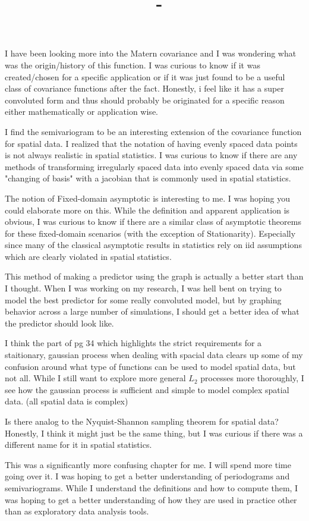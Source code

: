 \documentclass[answers,12pt,addpoints]{exam}
\author{\name}
\title{\course \ - \assignment}
\begin{document}
\maketitle

\begin{questions}
    \question I have been looking more into the Matern covariance and I was wondering what was the origin/history of this function. I was curious to know if it was created/chosen for a specific application or if it was just found to be a useful class of covariance functions after the fact. Honestly, i feel like it has a super convoluted form and thus should probably be originated for a specific reason either mathematically or application wise.

    \question I find the semivariogram to be an interesting extension of the covariance function for spatial data. I realized that the notation of having evenly spaced data points is not always realistic in spatial statistics. I was curious to know if there are any methods of transforming irregularly spaced data into evenly spaced data via some "changing of basis" with a jacobian that is commonly used in spatial statistics.

    \question The notion of Fixed-domain asymptotic is interesting to me. I was hoping you could elaborate more on this. While the definition and apparent application is obvious, I was curious to know if there are a similar class of asymptotic theorems for these fixed-domain scenarios (with the exception of Stationarity). Especially since many of the classical asymptotic results in statistics rely on iid assumptions which are clearly violated in spatial statistics. 

    \question This method of making a predictor using the graph is actually a better start than I thought. When I was working on my research, I was hell bent on trying to model the best predictor for some really convoluted model, but by graphing behavior across a large number of simulations, I should get a better idea of what the predictor should look like.

    \question I think the part of pg 34 which highlights the strict requirements for a staitionary, gaussian process when dealing with spacial data clears up some of my confusion around what type of functions can be used to model spatial data, but not all. While I still want to explore more general $L_2$ processes more thoroughly, I see how the gaussian process is sufficient and simple to model complex spatial data. (all spatial data is complex)

    \question Is there analog to the Nyquist-Shannon sampling theorem for spatial data? Honestly, I think it might just be the same thing, but I was curious if there was a different name for it in spatial statistics.

    \question This was a significantly more confusing chapter for me. I will spend more time going over it. I was hoping to get a better understanding of periodograms and semivariograms. While I understand the definitions and how to compute them, I was hoping to get a better understanding of how they are used in practice other than as exploratory data analysis tools. 
    \end{questions}
\end{document}
